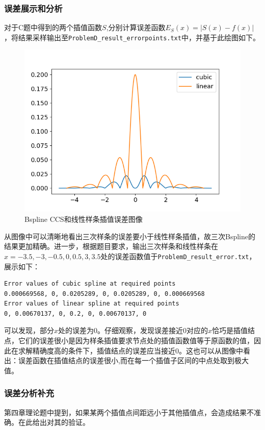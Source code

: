 \documentclass{ctexart}
\begin{document}
\begin{sloppypar}
\subsubsection{误差展示和分析}
对于C题中得到的两个插值函数$S$,分别计算误差函数$E_S(x) = |S(x)-f(x)|$，将结果采样输出至\verb|ProblemD_result_errorpoints.txt|中，并基于此绘图如下。
\begin{figure}[H]
\centering
\includegraphics[scale = 0.5]{fig//ProblemD_errorfunction.png}
\caption{Bspline CCS和线性样条插值误差图像}
\label{fig9}
\end{figure}
从图像中可以清晰地看出三次样条的误差要小于线性样条插值，故三次Bspline的结果更加精确。进一步，根据题目要求，输出三次样条和线性样条在$x=-3.5,-3,-0.5,0,0.5,3,3.5$处的误差函数值于\verb|ProblemD_result_error.txt|，展示如下：
\begin{shaded}
\begin{verbatim}
Error values of cubic spline at required points
0.000669568, 0, 0.0205289, 0, 0.0205289, 0, 0.000669568
Error values of linear spline at required points
0, 0.00670137, 0, 0.2, 0, 0.00670137, 0
\end{verbatim}
\end{shaded}
可以发现，部分$x$处的误差为0。仔细观察，发现误差接近0对应的$x$恰巧是插值结点，它们的误差很小是因为样条插值要求节点处的插值函数值等于原函数的值，因此在求解精确度高的条件下，插值结点的误差应当接近0。这也可以从图像中看出：误差函数在插值结点的误差很小,而在每一个插值子区间的中点处取到极大值。

\subsubsection{误差分析补充}
第四章理论题\uppercase\expandafter{}中提到，如果某两个插值点间距远小于其他插值点，会造成结果不准确。在此给出对其的验证。


\end{sloppypar}
\end{document}
